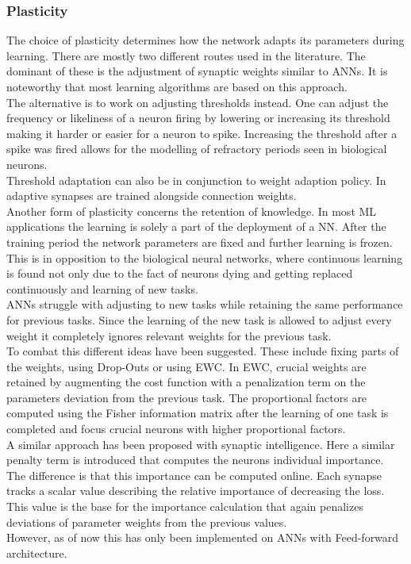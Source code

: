 \subsubsection{Plasticity}\label{sssec:plasticity}
	The choice of plasticity determines how the network adapts its parameters during learning. There are mostly two different routes used in the literature. The dominant of these is the adjustment of synaptic weights similar to \acp{ANN}. It is noteworthy that most learning algorithms are based on this approach.\\
	The alternative is to work on adjusting thresholds instead\cite{chen_adaptive_2022,amin_automated_2021}. One can adjust the frequency or likeliness of a neuron firing by lowering or increasing its threshold making it harder or easier for a neuron to spike. Increasing the threshold after a spike was fired allows for the modelling of refractory periods seen in biological neurons.\\
	Threshold adaptation can also be in conjunction to weight adaption policy. In \cite{sun_synapse-threshold_2023} adaptive synapses are trained alongside connection weights.\\
	Another form of plasticity concerns the retention of knowledge. In most \ac{ML} applications the learning is solely a part of the deployment of a \ac{NN}. After the training period the network parameters are fixed and further learning is frozen. This is in opposition to the biological neural networks, where continuous learning is found not only due to the fact of neurons dying and getting replaced continuously and learning of new tasks.\\
	\acp{ANN} struggle with adjusting to new tasks while retaining the same performance for previous tasks. Since the learning of the new task is allowed to adjust every weight it completely ignores relevant weights for the previous task.\\
	To combat this different ideas have been suggested. These include fixing parts of the weights, using Drop-Outs or using \ac{EWC}\cite{kirkpatrick_overcoming_2017}. In \ac{EWC}, crucial weights are retained by augmenting the cost function with a penalization term on the parameters deviation from the previous task. The proportional factors are computed using the Fisher information matrix after the learning of one task is completed and focus crucial neurons with higher proportional factors.\\
	A similar approach has been proposed with synaptic intelligence\cite{zenke_continual_2017}.
	Here a similar penalty term is introduced that computes the neurons individual importance. The difference is that this importance can be computed online. Each synapse tracks a scalar value describing the relative importance of decreasing the loss. This value is the base for the importance calculation that again penalizes deviations of parameter weights from the previous values.\\
	However, as of now this has only been implemented on \acp{ANN} with Feed-forward architecture.

